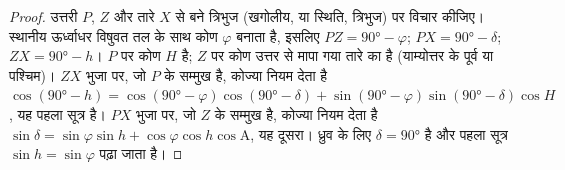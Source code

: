 \begin{proof}
उत्तरी  $P$,  $Z$ और तारे $X$ से बने त्रिभुज (खगोलीय, या स्थिति, त्रिभुज)
पर विचार कीजिए। स्थानीय ऊर्ध्वाधर विषुवत तल के साथ कोण $\varphi$ बनाता है, इसलिए $PZ =
\ang{90} - \varphi$; $PX = \ang{90} - \delta$; $ZX = \ang{90} - h$। $P$ पर कोण  $H$
है; $Z$ पर कोण उत्तर से मापा गया तारे का  है (याम्योत्तर के पूर्व या पश्चिम)। $ZX$
भुजा पर, जो $P$ के सम्मुख है, कोज्या नियम देता है
$\cos(\ang{90} - h) = \cos(\ang{90} - \varphi)\cos(\ang{90} - \delta) +
\sin(\ang{90} - \varphi)\sin(\ang{90} - \delta)\cos H$, यह पहला सूत्र है।
$PX$ भुजा पर, जो $Z$ के सम्मुख है, कोज्या नियम देता है
$\sin\delta = \sin\varphi\sin h + \cos\varphi\cos h\cos\mathrm{A}$, यह दूसरा। ध्रुव के लिए
$\delta = \ang{90}$ है और पहला सूत्र $\sin h = \sin\varphi$ पढ़ा जाता है।
\end{proof}


